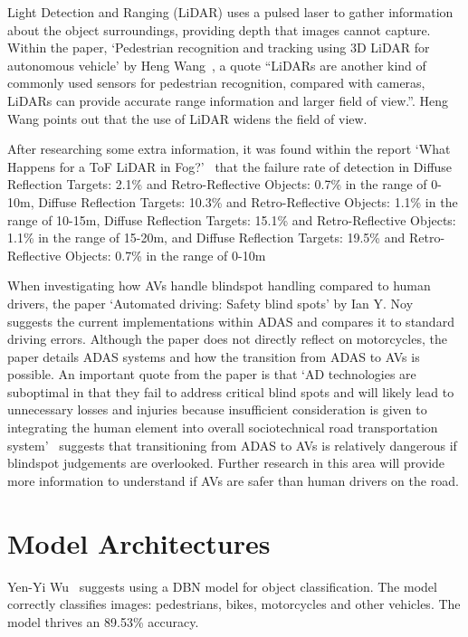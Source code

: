 \documentclass[12pt]{report} %
\begin{document}
		Light Detection and Ranging (LiDAR) uses a pulsed laser to gather information about the object surroundings, providing depth that images cannot capture. Within the paper, `Pedestrian recognition and tracking using 3D LiDAR for autonomous vehicle' by Heng Wang~\cite{wang_pedestrian_2017}, a quote ``LiDARs are another kind of commonly used sensors for pedestrian recognition, compared with cameras, LiDARs can provide accurate range information and larger field of view.''. Heng Wang points out that the use of LiDAR widens the field of view.
		
		After researching some extra information, it was found within the report `What Happens for a ToF LiDAR in Fog?'~\cite{li_what_2021} that the failure rate of detection in Diffuse Reflection Targets: 2.1\% and Retro-Reflective Objects: 0.7\% in the range of 0-10m, Diffuse Reflection Targets: 10.3\% and Retro-Reflective Objects: 1.1\% in the range of 10-15m, Diffuse Reflection Targets: 15.1\% and Retro-Reflective Objects: 1.1\% in the range of 15-20m, and Diffuse Reflection Targets: 19.5\% and Retro-Reflective Objects: 0.7\% in the range of 0-10m~\cite{royo_overview_2019}

		When investigating how AVs handle blindspot handling compared to human drivers, the paper `Automated driving: Safety blind spots' by Ian Y. Noy~\cite{noy_automated_2018} suggests the current implementations within ADAS and compares it to standard driving errors. Although the paper does not directly reflect on motorcycles, the paper details ADAS systems and how the transition from ADAS to AVs is possible. An important quote from the paper is that `AD technologies are suboptimal in that they fail to address critical blind spots and will likely lead to unnecessary losses and injuries because insufficient consideration is given to integrating the human element into overall sociotechnical road transportation system'~\cite{noy_automated_2018} suggests that transitioning from ADAS to AVs is relatively dangerous if blindspot judgements are overlooked. Further research in this area will provide more information to understand if AVs are safer than human drivers on the road.

	\section{Model Architectures}
		Yen-Yi Wu~\cite{wu_pedestrian_2016} suggests using a DBN model for object classification. The model correctly classifies images: pedestrians, bikes, motorcycles and other vehicles. The model thrives an 89.53\% accuracy.
\end{document}
